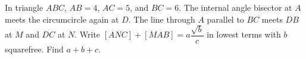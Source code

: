In triangle $ABC$, $AB=4$, $AC=5$, and $BC=6$. The internal angle bisector at $A$ meets the circumcircle again at $D$. The line through $A$ parallel to $BC$ meets $DB$ at $M$ and $DC$ at $N$. Write $[ANC]+[MAB]=a\dfrac{\sqrt b}{c}$ in lowest terms with $b$ squarefree. Find $a+b+c$.
